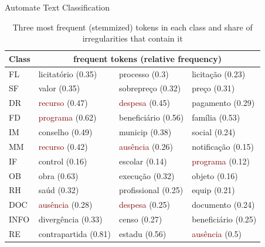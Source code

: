 \documentclass[handout,t,usenames,dvipsnames]{beamer}
\begin{document}
\begin{frame}{Automate Text Classification}
\begin{table}[h]
\tiny
\begin{center}
    \centering
\label{table:freqWords}   
 \begin{tabular}{p{1.5cm} p{2cm} p{2cm} p{2cm}} 
 \toprule
 \textbf{Class} & \multicolumn{3}{c}{\textbf{frequent tokens} (relative frequency)}\\\midrule
 FL & licitatório (0.35) & processo (0.3) & licitação (0.23) \\ \midrule
 SF & valor (0.35)  & sobrepreço (0.32) & preço (0.31) \\ \midrule
 DR & \textcolor{Maroon}{recurso} (0.47) & \textcolor{Maroon}{despesa} (0.45) & pagamento (0.29) \\ \midrule
 FD &  \textcolor{Maroon}{programa} (0.62) & beneficiário (0.56) & família (0.53) \\ \midrule
 IM & conselho (0.49) & municip (0.38) & social (0.24) \\ \midrule
 MM &  \textcolor{Maroon}{recurso} (0.42) &  \textcolor{Maroon}{ausência} (0.26) & notificação (0.15) \\ \midrule
 IF & control (0.16) & escolar (0.14) &  \textcolor{Maroon}{programa} (0.12) \\ \midrule
 OB & obra (0.63) & execução (0.32) & objeto (0.16) \\ \midrule
 RH & saúd (0.32) & profissional (0.25) & equip (0.21) \\ \midrule
 DOC &  \textcolor{Maroon}{ausência} (0.28) & \textcolor{Maroon}{despesa} (0.25) & documento (0.24) \\ \midrule
 INFO & divergência (0.33) & censo (0.27) & beneficiário (0.25) \\ \midrule
 RE & contrapartida (0.81) & estadu (0.56) &  \textcolor{Maroon}{ausência} (0.5) \\ \midrule
\end{tabular}
\end{center}
\caption{Three most frequent (stemmized) tokens in each class and share of irregularities that contain it}
\end{table}
 
\end{frame}
\end{document}
